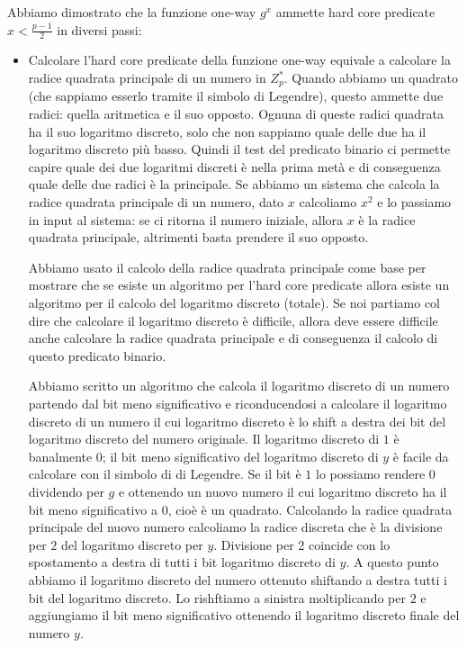 Abbiamo dimostrato che la funzione one-way $g^x$ ammette hard core predicate $x < \frac{p-1}{2}$ in diversi passi:
\begin{itemize}
    \item Calcolare l'hard core predicate della funzione one-way equivale a calcolare la radice quadrata principale di un numero in $Z_p^*$. Quando abbiamo un quadrato (che sappiamo esserlo tramite il simbolo di Legendre), questo ammette due radici: quella aritmetica e il suo opposto. Ognuna di queste radici quadrata ha il suo logaritmo discreto, solo che non sappiamo quale delle due ha il logaritmo discreto più basso. Quindi il test del predicato binario ci permette capire quale dei due logaritmi discreti è nella prima metà e di conseguenza quale delle due radici è la principale.  Se abbiamo un sistema che calcola la radice quadrata principale di un numero, dato $x$ calcoliamo $x^2$ e lo passiamo in input al sistema: se ci ritorna il numero iniziale, allora $x$ è la radice quadrata principale, altrimenti basta prendere il suo opposto. 
    
    Abbiamo usato il calcolo della radice quadrata principale come base per mostrare che se esiste un algoritmo per l'hard core predicate allora esiste un algoritmo per il calcolo del logaritmo discreto (totale). Se noi partiamo col dire che calcolare il logaritmo discreto è difficile, allora deve essere difficile anche calcolare la radice quadrata principale e di conseguenza il calcolo di questo predicato binario.  
    
    Abbiamo scritto un algoritmo che calcola il logaritmo discreto di un numero partendo dal bit meno significativo e riconducendosi a calcolare il logaritmo discreto di un numero il cui logaritmo discreto è lo shift a destra dei bit del logaritmo discreto del numero originale. 
    Il logaritmo discreto di $1$ è banalmente $0$; il bit meno significativo del logaritmo discreto di $y$ è facile da calcolare con il simbolo di di Legendre. Se il bit è $1$ lo possiamo rendere $0$ dividendo per $g$ e ottenendo un nuovo numero il cui logaritmo discreto ha il bit meno significativo a $0$, cioè è un quadrato. Calcolando la radice quadrata principale del nuovo numero calcoliamo la radice discreta che è la divisione per $2$ del logaritmo discreto per $y$. Divisione per $2$ coincide con lo spostamento a destra di tutti i bit logaritmo discreto di $y$. A questo punto abbiamo il logaritmo discreto del numero ottenuto shiftando a destra tutti i bit del logaritmo discreto. Lo rishftiamo a sinistra moltiplicando per $2$ e aggiungiamo il bit meno significativo ottenendo il logaritmo discreto finale del numero $y$.
    

\end{itemize}
